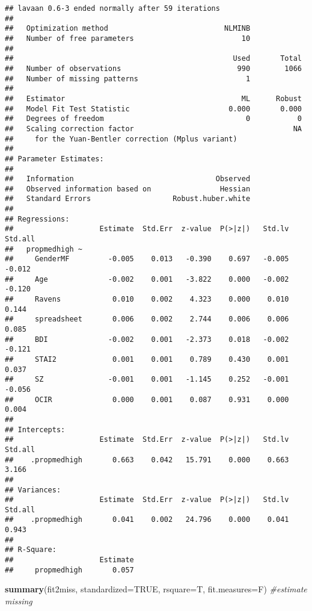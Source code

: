 \documentclass[]{article}
\newenvironment{Shaded}{\begin{snugshade}}{\end{snugshade}}
\newcommand{\KeywordTok}[1]{\textcolor[rgb]{0.13,0.29,0.53}{\textbf{#1}}}
\newcommand{\DataTypeTok}[1]{\textcolor[rgb]{0.13,0.29,0.53}{#1}}
\newcommand{\CommentTok}[1]{\textcolor[rgb]{0.56,0.35,0.01}{\textit{#1}}}
\newcommand{\OtherTok}[1]{\textcolor[rgb]{0.56,0.35,0.01}{#1}}
\newcommand{\NormalTok}[1]{#1}
\begin{document}
\begin{verbatim}
## lavaan 0.6-3 ended normally after 59 iterations
## 
##   Optimization method                           NLMINB
##   Number of free parameters                         10
## 
##                                                   Used       Total
##   Number of observations                           990        1066
##   Number of missing patterns                         1
## 
##   Estimator                                         ML      Robust
##   Model Fit Test Statistic                       0.000       0.000
##   Degrees of freedom                                 0           0
##   Scaling correction factor                                     NA
##     for the Yuan-Bentler correction (Mplus variant)
## 
## Parameter Estimates:
## 
##   Information                                 Observed
##   Observed information based on                Hessian
##   Standard Errors                   Robust.huber.white
## 
## Regressions:
##                    Estimate  Std.Err  z-value  P(>|z|)   Std.lv  Std.all
##   propmedhigh ~                                                         
##     GenderMF         -0.005    0.013   -0.390    0.697   -0.005   -0.012
##     Age              -0.002    0.001   -3.822    0.000   -0.002   -0.120
##     Ravens            0.010    0.002    4.323    0.000    0.010    0.144
##     spreadsheet       0.006    0.002    2.744    0.006    0.006    0.085
##     BDI              -0.002    0.001   -2.373    0.018   -0.002   -0.121
##     STAI2             0.001    0.001    0.789    0.430    0.001    0.037
##     SZ               -0.001    0.001   -1.145    0.252   -0.001   -0.056
##     OCIR              0.000    0.001    0.087    0.931    0.000    0.004
## 
## Intercepts:
##                    Estimate  Std.Err  z-value  P(>|z|)   Std.lv  Std.all
##    .propmedhigh       0.663    0.042   15.791    0.000    0.663    3.166
## 
## Variances:
##                    Estimate  Std.Err  z-value  P(>|z|)   Std.lv  Std.all
##    .propmedhigh       0.041    0.002   24.796    0.000    0.041    0.943
## 
## R-Square:
##                    Estimate
##     propmedhigh       0.057
\end{verbatim}

\begin{Shaded}
\begin{Highlighting}[]
\KeywordTok{summary}\NormalTok{(fit2miss, }\DataTypeTok{standardized=}\OtherTok{TRUE}\NormalTok{, }\DataTypeTok{rsquare=}\NormalTok{T, }\DataTypeTok{fit.measures=}\NormalTok{F) }\CommentTok{#estimate missing}
\end{Highlighting}
\end{Shaded}
\end{document}
